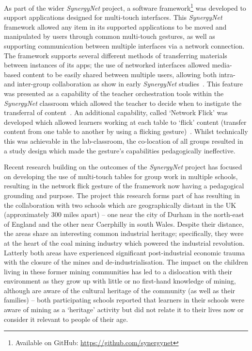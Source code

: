 \documentclass[twocolumn]{svjour3}          %
\begin{document}
As part of the wider {\emph{SynergyNet}} project, a software framework\footnote{Available on GitHub: \url{https://github.com/synergynet}} was developed to support applications designed for multi-touch interfaces.
This {\emph{SynergyNet}} framework allowed any item in its supported applications to be moved and manipulated by users through common multi-touch gestures, as well as supporting communication between multiple interfaces via a network connection.
The framework supports several different methods of transferring materials between instances of its apps; the use of networked interfaces allowed media-based content to be easily shared between multiple users, allowing both intra- and inter-group collaboration as show in early {\emph{SynergyNet}} studies~\citep{mercier:2014b}.
This feature was presented as a capability of the teacher orchestration tools within the {\emph{SynergyNet}} classroom which allowed the teacher to decide when to instigate the transferral of content~\citep{alagha-et-al:2010,mercier:2016}.
An additional capability, called `Network Flick' was developed which allowed learners working at each table to ‘flick’ content (transfer content from one table to another by using a flicking gesture)~\citep{reetz-et-al:2006}.
Whilst technically this was achievable in the lab-classroom, the co-location of all groups resulted in a study design which made the gesture’s capabilities pedagogically ineffective.

Recent research building on the outcomes of the {\emph{SynergyNet}} project has focused on developing the use of multi-touch tables for group work in multiple schools, resulting in the network flick gesture of the framework now having a pedagogical grounding and purpose.
The project this research forms part of has resulting in the collaboration with two schools which are geographically distant in the UK (approximately 300 miles apart) -- one near the city of Durham in the north-east of England and the other near Caerphilly in south Wales.
Despite their distance, the areas share an interesting common industrial heritage; specifically, they were at the heart of the coal mining industry which powered the industrial revolution.
Latterly both areas have experienced significant post-industrial economic trauma with the closure of the mines and de-industrialisation.
The impact on the children living in these former mining communities has led to a dislocation with their environment as they grow up with little or no first-hand knowledge of mining, although are aware of the cultural heritage of the community (as well as their families) -- both participating schools reported that learners in their schools were aware of mining as a ‘heritage’ activity but did not relate it to their lives now or consider it relevant to people of their age.
\end{document}
